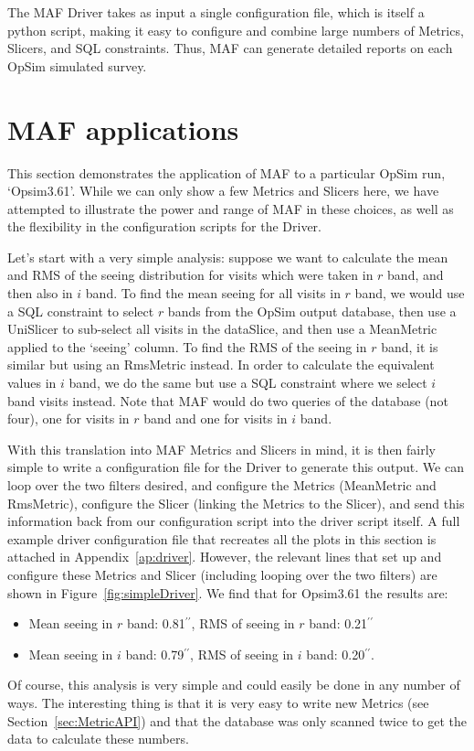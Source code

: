 \documentclass[]{spie}  %
\def\arcsec{$^{\prime\prime}$}
\begin{document}
The MAF Driver takes as input a single configuration file, which is
itself a python script, making it easy to configure and combine large
numbers of Metrics, Slicers, and SQL constraints.  Thus, MAF can
generate detailed reports on each OpSim simulated survey.

\section{MAF applications}
\label{sec:examples}

This section demonstrates the application of MAF to a particular OpSim
run, `Opsim3.61'. While we can only show a few Metrics and Slicers
here, we have attempted to illustrate the power and range of MAF in
these choices, as well as the flexibility in the configuration scripts
for the Driver.

Let's start with a very simple analysis: suppose we want to calculate
the mean and RMS of the seeing distribution for visits which were
taken in $r$ band, and then also in $i$ band. To find the mean seeing
for all visits in $r$ band, we would use a SQL constraint to select
$r$ bands from the OpSim output database, then use a UniSlicer to
sub-select all visits in the dataSlice, and then use a MeanMetric
applied to the `seeing' column. To find the RMS of the seeing in $r$
band, it is similar but using an RmsMetric instead. In order to
calculate the equivalent values in $i$ band, we do the same but use a
SQL constraint where we select $i$ band visits instead. Note that MAF
would do two queries of the database (not four), one for visits in $r$
band and one for visits in $i$ band.

With this translation into MAF Metrics and Slicers in mind, it is then
fairly simple to write a configuration
file for the Driver to generate this output.  We can loop over the two
filters desired, and configure the Metrics (MeanMetric and RmsMetric),
configure the Slicer (linking the Metrics to the Slicer), and send
this information back from our configuration script into the driver
script itself. A full example driver
configuration file that recreates all the plots in this section is
attached in Appendix~\ref{ap:driver}.  However, the relevant lines
that set up and configure these Metrics and Slicer (including looping
over the two filters) are shown in Figure~\ref{fig:simpleDriver}. We
find that for Opsim3.61 the results are: 
\begin{itemize}
\item{Mean seeing in $r$ band: 0.81\arcsec, RMS of seeing in $r$ band: 0.21\arcsec}
\item{Mean seeing in $i$ band: 0.79\arcsec, RMS of seeing in $i$ band: 0.20\arcsec.}
\end{itemize}
Of course, this analysis is very simple and could easily be done in
any number of ways. The interesting thing is that it is very easy to
write new Metrics (see Section~\ref{sec:MetricAPI}) and that the
database was only scanned twice to get the data to calculate these
numbers. 
\end{document}
